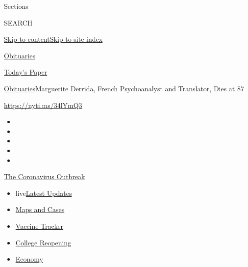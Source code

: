 Sections

SEARCH

\protect\hyperlink{site-content}{Skip to
content}\protect\hyperlink{site-index}{Skip to site index}

\href{https://www.nytimes3xbfgragh.onion/section/obituaries}{Obituaries}

\href{https://myaccount.nytimes3xbfgragh.onion/auth/login?response_type=cookie\&client_id=vi}{}

\href{https://www.nytimes3xbfgragh.onion/section/todayspaper}{Today's
Paper}

\href{/section/obituaries}{Obituaries}\textbar{}Marguerite Derrida,
French Psychoanalyst and Translator, Dies at 87

\url{https://nyti.ms/34lYmQ3}

\begin{itemize}
\item
\item
\item
\item
\item
\end{itemize}

\href{https://www.nytimes3xbfgragh.onion/news-event/coronavirus?action=click\&pgtype=Article\&state=default\&region=TOP_BANNER\&context=storylines_menu}{The
Coronavirus Outbreak}

\begin{itemize}
\tightlist
\item
  live\href{https://www.nytimes3xbfgragh.onion/2020/08/04/world/coronavirus-covid-19.html?action=click\&pgtype=Article\&state=default\&region=TOP_BANNER\&context=storylines_menu}{Latest
  Updates}
\item
  \href{https://www.nytimes3xbfgragh.onion/interactive/2020/us/coronavirus-us-cases.html?action=click\&pgtype=Article\&state=default\&region=TOP_BANNER\&context=storylines_menu}{Maps
  and Cases}
\item
  \href{https://www.nytimes3xbfgragh.onion/interactive/2020/science/coronavirus-vaccine-tracker.html?action=click\&pgtype=Article\&state=default\&region=TOP_BANNER\&context=storylines_menu}{Vaccine
  Tracker}
\item
  \href{https://www.nytimes3xbfgragh.onion/2020/08/02/us/covid-college-reopening.html?action=click\&pgtype=Article\&state=default\&region=TOP_BANNER\&context=storylines_menu}{College
  Reopening}
\item
  \href{https://www.nytimes3xbfgragh.onion/live/2020/08/03/business/stock-market-today-coronavirus?action=click\&pgtype=Article\&state=default\&region=TOP_BANNER\&context=storylines_menu}{Economy}
\end{itemize}

